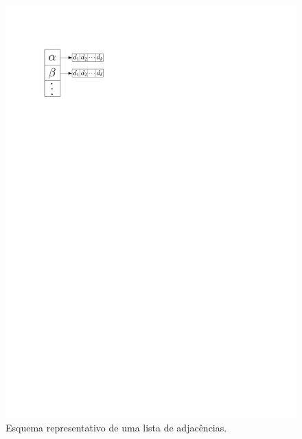 \documentclass[a4paper, 12pt]{article}
\begin{document}
\begin{figure}[h]
\centering
\includegraphics[scale=0.8]{adjcencies_list.pdf}
\caption{Esquema representativo de uma lista de adjacências.}
\label{img:adjacencies_list}
\end{figure}
\end{document}
